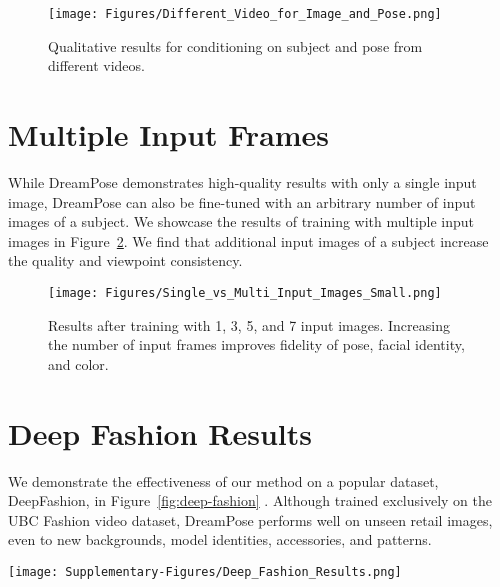        \begin{figure}[h!]
            \begin{center}
                \texttt{[image: Figures/Different\_Video\_for\_Image\_and\_Pose.png]}
            \end{center}
        \caption{Qualitative results for conditioning on subject and pose from different videos.}
        \label{fig:diff-video-pose}
        \end{figure}

\section{Multiple Input Frames}
    While DreamPose demonstrates high-quality results with only a single input image, DreamPose can also be fine-tuned with an arbitrary number of input images of a subject. We showcase the results of training with multiple input images in Figure~\ref{fig:multi-image}. We find that additional input images of a subject increase the quality and viewpoint consistency.

        \begin{figure}%
            \begin{center}
                \texttt{[image: Figures/Single\_vs\_Multi\_Input\_Images\_Small.png]}
            \end{center}
           \caption{Results after training with 1, 3, 5, and 7 input images. Increasing the number of input frames improves fidelity of pose, facial identity, and color.  }
        \label{fig:multi-image}
        \end{figure}
        
\section{Deep Fashion Results} 
    We demonstrate the effectiveness of our method on a popular dataset, DeepFashion, in Figure~\ref{fig:deep-fashion} \cite{pose-transfer-dm, deep-fashion}. Although trained exclusively on the UBC Fashion video dataset, DreamPose performs well on unseen retail images, even to new backgrounds, model identities, accessories, and patterns.

        \begin{figure*}[h!]
            \begin{center}
                \texttt{[image: Supplementary-Figures/Deep\_Fashion\_Results.png]}
            \end{center}
           \caption{ DreamPose results on unseen samples from the DeepFashion dataset \cite{deep-fashion}. Despite being trained exclusively on the UBC Fashion Dataset, our method generalizes to new garments and model identities after subject-specific finetuning of the base model.}
        \label{fig:deep-fashion}
        \end{figure*}

